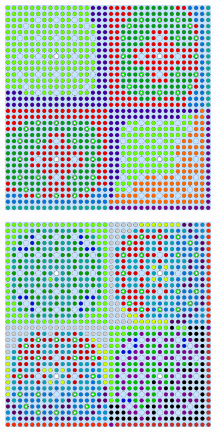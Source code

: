 \begin{figure}[h!]
\begin{subfigure}{0.48\textwidth}
  \caption{}
  \label{fig:chap10-reflector-pinch-4}
\end{subfigure}%
\begin{subfigure}{0.48\textwidth}
  \centering
  \includegraphics[width=0.9\linewidth]{figures/unsupervised/geometries/with-features/4-clusters/combined/reflector}
  \caption{}
  \label{fig:chap10-reflector-combined-4}
\end{subfigure}
\begin{subfigure}{0.48\textwidth}
  \centering
  \includegraphics[width=0.9\linewidth]{figures/unsupervised/geometries/with-features/8-clusters/pinch/reflector}

\end{subfigure}
\end{figure}
